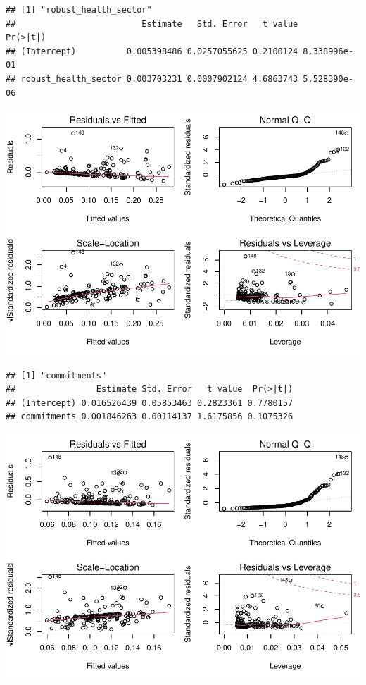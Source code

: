 \documentclass[
]{article}
\begin{document}
\begin{verbatim}
## [1] "robust_health_sector"
##                         Estimate   Std. Error   t value     Pr(>|t|)
## (Intercept)          0.005398486 0.0257055625 0.2100124 8.338996e-01
## robust_health_sector 0.003703231 0.0007902124 4.6863743 5.528390e-06
\end{verbatim}

\includegraphics{Basic-Regression_files/figure-latex/unnamed-chunk-5-4.pdf}

\begin{verbatim}
## [1] "commitments"
##                Estimate Std. Error   t value  Pr(>|t|)
## (Intercept) 0.016526439 0.05853463 0.2823361 0.7780157
## commitments 0.001846263 0.00114137 1.6175856 0.1075326
\end{verbatim}

\includegraphics{Basic-Regression_files/figure-latex/unnamed-chunk-5-5.pdf}
\end{document}
